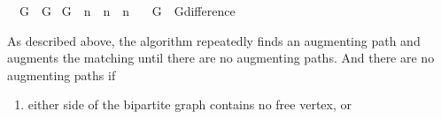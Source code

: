 \begin{isabellebody}
\ \ {\isachardoublequoteopen}G{}\ {\isasymequiv}\ G{}{\isacharunderscore}{\kern0pt}{}{\isachardoublequoteclose}\isanewline
\isanewline
{}\isamarkupfalse%
\ G{}\ {\isacharcolon}{\kern0pt}{\isacharcolon}{\kern0pt}\ {\isachardoublequoteopen}{\isacharprime}{\kern0pt}n\ {\isasymRightarrow}\ {\isacharprime}{\kern0pt}n\ {\isasymRightarrow}\ {\isacharprime}{\kern0pt}n{\isachardoublequoteclose}\ \isanewline
\ \ {\isachardoublequoteopen}G{}\ {\isasymequiv}\ G{\isachardot}{\kern0pt}difference{\isachardoublequoteclose}%
\begin{isamarkuptext}%
As described above, the algorithm repeatedly finds an augmenting path and augments the matching
until there are no augmenting paths. And there are no augmenting paths if

%
\begin{enumerate}%
\item either side of the bipartite graph contains no free vertex, or


\end{enumerate}
\end{isamarkuptext}
\end{isabellebody}
